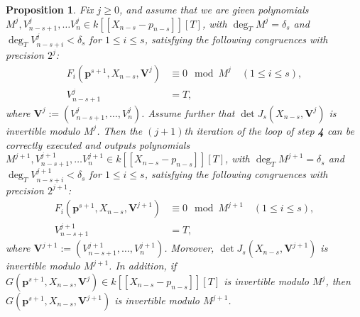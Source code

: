 \documentclass[10pt,a4paper]{amsart}
\newtheorem{proposition}{Proposition}
\newcommand{\bfs}{\boldsymbol}
\begin{document}
\begin{proposition}\label{prop: main loop Newton lifting}
Fix $j\ge 0$, and assume that we are given polynomials $M^j,V_{n-s+1}^j, \ldots V_n^j\in
k[\![X_{n-s} -p_{n-s}]\!][T]$, with $\deg_TM^j=\delta_s$ and $\deg_T
V_{n-s+i}^j<\delta_s$ for $1\le i\le s$, satisfying the following
congruences with precision $2^j$:
%
\begin{align}
F_i (\bfs p^{s+1}, X_{n-s}, \bfs V^j) & \equiv 0  \mod M^j\quad (1 \le i
\le s),
\label{eq: CongruenceProofHL1}\\
V_{n-s+1}^j& = T, \label{eq: CongruenceProofHL2}
\end{align}
%
where $\bfs V^j:=(V_{n-s+1}^j, \ldots, V_n^j)$. Assume further that
$\det J_s(X_{n-s}, \bfs V^j)$ is invertible modulo $M^j$. Then the
$(j+1)$th iteration of the loop of step {\bf 4} can be correctly
executed and outputs polynomials $M^{j+1},V_{n-s+1}^{j+1}, \ldots
V_n^{j+1} \in k[\![X_{n-s} -p_{n-s}]\!][T]$, with
$\deg_TM^{j+1}=\delta_s$ and $\deg_T V_{n-s+i}^{j+1}<\delta_s$ for
$1\le i\le s$, satisfying the following congruences with precision
$2^{j+1}$:
%
\begin{align*}
F_i (\bfs p^{s+1}, X_{n-s},\bfs V^{j+1})  & \equiv 0  \mod M^{j+1} \quad
(1 \le i \le s),
\\
V_{n-s+1}^{j+1}& = T,
\end{align*}
%
where $\bfs V^{j+1}\!:=(V_{n-s+1}^{j+1}, \ldots, V_n^{j+1})$.
Moreover, $\det J_s(X_{n-s},\bfs V^{j+1} )$ is invertible modulo
$M^{j+1}$. In addition, if $G(\bfs p^{s+1}, X_{n-s}, \bfs V^j)\in
k[\![X_{n-s} -p_{n-s}]\!][T]$ is invertible modulo $M^j$, then
$G(\bfs p^{s+1}, X_{n-s}, \bfs V^{j+1})$ is invertible modulo
$M^{j+1}$.
\end{proposition}
\end{document}
